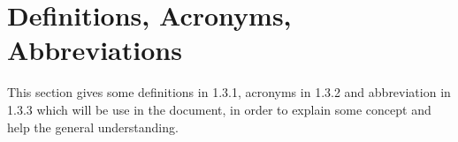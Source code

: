 \section{Definitions, Acronyms, Abbreviations}

This section gives some definitions in 1.3.1, acronyms in 1.3.2 and abbreviation in 1.3.3 which will be use in the document, in order to explain some concept and help the general understanding.



